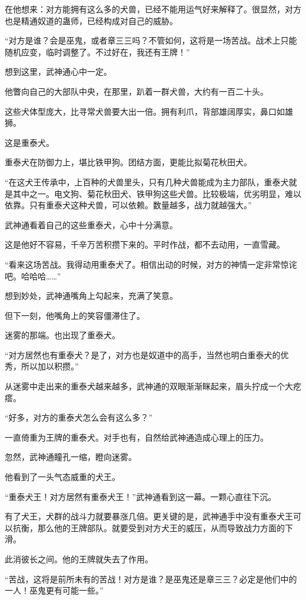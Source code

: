 \begin{this_body}
在他想来：对方能拥有这么多的犬兽，已经不能用运气好来解释了。很显然，对方也是精通奴道的蛊师，已经构成对自己的威胁。

“对方是谁？会是巫鬼，或者章三三吗？不管如何，这将是一场苦战。战术上只能随机应变，临时调整了。不过好在，我还有王牌！”

想到这里，武神通心中一定。

他瞥向自己的大部队中央，在那里，趴着一群犬兽，大约有一百二十头。

这些犬体型庞大，比寻常犬兽要大出一倍。拥有利爪，背部雄阔厚实，鼻口如雄狮。

这是重泰犬。

重泰犬在防御力上，堪比铁甲狗。团结方面，更能比拟菊花秋田犬。

“在这犬王传承中，上百种的犬兽里头，只有几种犬兽能成为主力部队，重泰犬就是其中之一。电文狗、菊花秋田犬、铁甲狗这些犬兽。比较极端，优劣明显，难以依靠。只有重泰犬这种犬兽，可以依赖。数量越多，战力就越强大。”

武神通看着自己的这些重泰犬，心中十分满意。

这是他好不容易，千辛万苦积攒下来的。平时作战，都不去动用，一直雪藏。

“看来这场苦战。我得动用重泰犬了。相信出动的时候，对方的神情一定非常惊诧吧。哈哈哈……”

想到妙处，武神通嘴角上勾起来，充满了笑意。

但下一刻，他嘴角上的笑容僵滞住了。

迷雾的那端。也出现了重泰犬。

“对方居然也有重泰犬？是了，对方也是奴道中的高手，当然也明白重泰犬的优秀，所以加以积攒。”

从迷雾中走出来的重泰犬越来越多，武神通的双眼渐渐眯起来，眉头拧成一个大疙瘩。

“好多，对方的重泰犬怎么会有这么多？”

一直倚重为王牌的重泰犬。对手也有，自然给武神通造成心理上的压力。

忽然，武神通瞳孔一缩，瞪向迷雾。

他看到了一头气态威重的犬王。

“重泰犬王！对方居然有重泰犬王！”武神通看到这一幕。一颗心直往下沉。

有了犬王，犬群的战斗力就要暴涨几倍。更关键的是，武神通手中没有重泰犬王可以抗衡，那么他的王牌部队。就要受到对方犬王的威压，从而导致战力方面的下滑。

此消彼长之间。他的王牌就失去了作用。

“苦战，这将是前所未有的苦战！对方是谁？是巫鬼还是章三三？必定是他们中的一人！巫鬼更有可能一些。”


\end{this_body}
